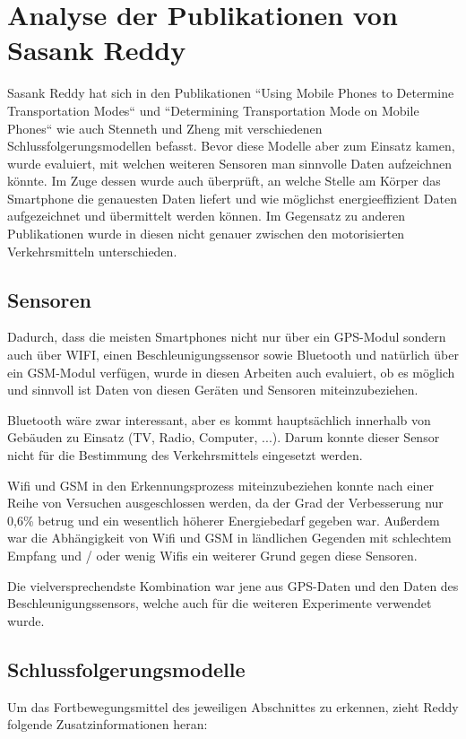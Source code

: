 \section{Analyse der Publikationen von Sasank Reddy}
Sasank Reddy hat sich in den Publikationen ``Using Mobile Phones to Determine Transportation Modes`` \cite{reddy_using_2010} und ``Determining Transportation Mode on Mobile Phones`` \cite{reddy_determining_2008} wie auch Stenneth und Zheng mit verschiedenen Schlussfolgerungsmodellen befasst. Bevor diese Modelle aber zum Einsatz kamen, wurde evaluiert, mit welchen weiteren Sensoren man sinnvolle Daten aufzeichnen könnte. Im Zuge dessen wurde auch überprüft, an welche Stelle am Körper das Smartphone die genauesten Daten liefert und wie möglichst energieeffizient Daten aufgezeichnet und übermittelt werden können. Im Gegensatz zu anderen Publikationen wurde in diesen nicht genauer zwischen den motorisierten Verkehrsmitteln unterschieden.

\subsection{Sensoren}
Dadurch, dass die meisten Smartphones nicht nur über ein GPS-Modul sondern auch über WIFI, einen Beschleunigungssensor sowie Bluetooth und natürlich über ein GSM-Modul verfügen, wurde in diesen Arbeiten auch evaluiert, ob es möglich und sinnvoll ist Daten von diesen Geräten und Sensoren miteinzubeziehen. 

Bluetooth  wäre zwar interessant, aber es kommt hauptsächlich innerhalb von Gebäuden zu Einsatz (TV, Radio, Computer, ...). Darum konnte dieser Sensor nicht für die Bestimmung des Verkehrsmittels eingesetzt werden. 

Wifi und GSM in den Erkennungsprozess miteinzubeziehen konnte nach einer Reihe von Versuchen ausgeschlossen werden, da der Grad der Verbesserung nur 0,6\% betrug und ein wesentlich höherer Energiebedarf gegeben war. Außerdem war die Abhängigkeit von Wifi und GSM in ländlichen Gegenden mit schlechtem Empfang und / oder wenig Wifis ein weiterer Grund gegen diese Sensoren.

Die vielversprechendste Kombination war jene aus GPS-Daten und den Daten des Beschleunigungssensors, welche auch  für die weiteren Experimente verwendet wurde.

\subsection{Schlussfolgerungsmodelle}
Um das Fortbewegungsmittel des jeweiligen Abschnittes zu erkennen, zieht Reddy folgende Zusatzinformationen heran:

